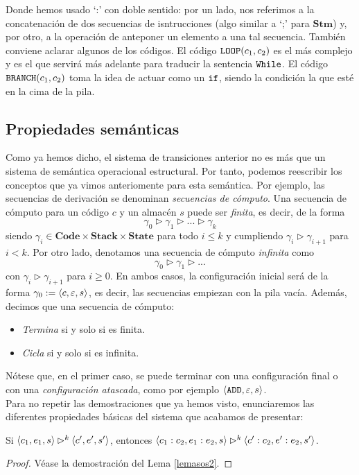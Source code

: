 Donde hemos usado `:' con doble sentido: por un lado, nos referimos a la concatenación de dos secuencias de isntrucciones (algo similar a `;' para $\mathbf{Stm}$) y, por otro, a la operación de anteponer un elemento a una tal secuencia. También conviene aclarar algunos de los códigos. El código $\texttt{LOOP}(c_1,c_2)$ es el más complejo y es el que servirá más adelante para traducir la sentencia $\texttt{While}$. El código $\texttt{BRANCH}(c_1, c_2)$ toma la idea de actuar como un $\texttt{if}$, siendo la condición la que esté en la cima de la pila.
\\ 

\subsection{Propiedades semánticas}

Como ya hemos dicho, el sistema de transiciones anterior no es más que un sistema de semántica operacional estructural. Por tanto, podemos reescribir los conceptos que ya vimos anteriomente para esta semántica. Por ejemplo, las secuencias de derivación se denominan \textit{secuencias de cómputo}. Una secuencia de cómputo para un código $c$ y un almacén $s$ puede ser \textit{finita}, es decir, de la forma
\[
    \gamma_0 \rhd \gamma_1 \rhd ... \rhd \gamma_k
\]
siendo $\gamma_i \in \textbf{Code}\times\textbf{Stack} \times \textbf{State}$ para todo $i\leq k$ y cumpliendo $\gamma_i \rhd \gamma_{i+1}$ para $i<k$. Por otro lado, denotamos una secuencia de cómputo \textit{infinita} como
\[
    \gamma_0 \rhd \gamma_1 \rhd ...
\]
con  $\gamma_i \rhd \gamma_{i+1}$ para $i\geq 0$. En ambos casos, la configuración inicial será de la forma $\gamma_0 := \langle c, \varepsilon, s \rangle$, es decir, las secuencias empiezan con la pila vacía. Además, decimos que una secuencia de cómputo:
\begin{itemize}
    \item \textit{Termina} si y solo si es finita.
    \item \textit{Cicla} si y solo si es infinita.
\end{itemize}
Nótese que, en el primer caso, se puede terminar con una configuración final o con una \textit{configuración atascada}, como por ejemplo $\langle \texttt{ADD}, \varepsilon, s\rangle$.
\\

Para no repetir las demostraciones que ya hemos visto, enunciaremos las diferentes propiedades básicas del sistema que acabamos de presentar:

\begin{lema}
Si $\langle c_1, e_1, s \rangle\rhd^k \langle c', e', s' \rangle$, entonces $\langle c_1:c_2, e_1:e_2, s \rangle\rhd^k \langle c':c_2, e':e_2, s' \rangle$.
\end{lema}
\begin{proof}
Véase la demostración del Lema \ref{lemasos2}.
\end{proof}

